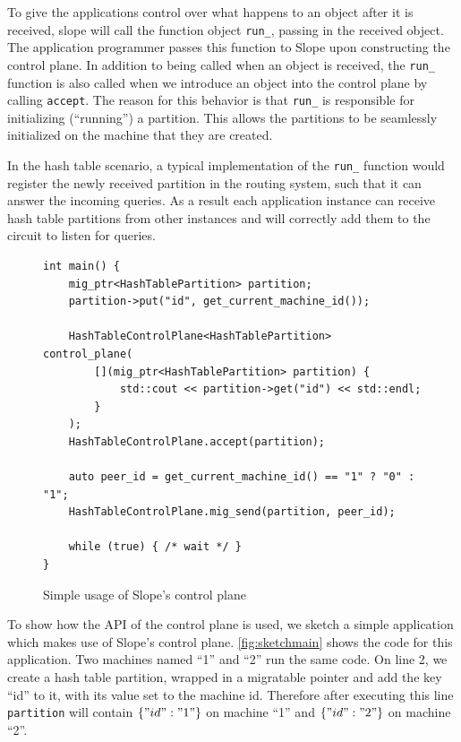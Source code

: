 To give the applications control over what happens to an object after it is
received, slope will call the function object \texttt{run\_}, passing in the
received object. The application programmer passes this function to Slope upon
constructing the control plane. In addition to being called when an object is
received, the \texttt{run\_} function is also called when we introduce an object
into the control plane by calling \texttt{accept}. The reason for this behavior
is that \texttt{run\_} is responsible for initializing (``running'') a partition.
This allows the partitions to be seamlessly initialized on the machine that they
are created.


In the hash table scenario, a typical
implementation of the \texttt{run\_} function would register the newly received
partition in the routing system, such that it can answer the incoming queries.
As a result each application instance can receive hash table partitions from
other instances and will correctly add them to the circuit to listen for queries.


\begin{figure}[tp]
\begin{lstlisting}
int main() {
    mig_ptr<HashTablePartition> partition;
    partition->put("id", get_current_machine_id());

    HashTableControlPlane<HashTablePartition> control_plane(
        [](mig_ptr<HashTablePartition> partition) {
            std::cout << partition->get("id") << std::endl;
        }
    );
    HashTableControlPlane.accept(partition);

    auto peer_id = get_current_machine_id() == "1" ? "0" : "1";
    HashTableControlPlane.mig_send(partition, peer_id);

    while (true) { /* wait */ }
}
\end{lstlisting}
\caption{
    Simple usage of Slope's control plane
}
\label{fig:sketchmain}
\end{figure}

To show how the API of the control plane is used, we sketch a simple application
which makes use of Slope's control plane.
\autoref{fig:sketchmain} shows the code for this application. Two machines
named ``1'' and ``2'' run the same code. On line 2, we create a hash table
partition, wrapped in a migratable pointer and add the key ``id'' to it, with its
value set to the machine id. Therefore after executing this line
\texttt{partition} will contain $\{"id": "1"\}$
on machine ``1'' and $\{"id": "2"\}$ on machine ``2''.

